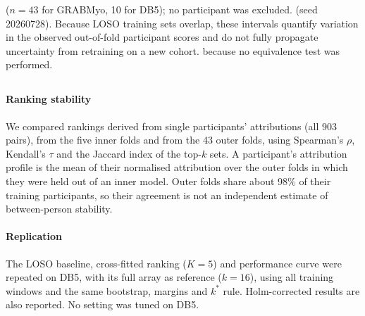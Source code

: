  ($n = 43$ for GRABMyo, 10 for DB5); no participant was excluded.  (seed 20260728). Because LOSO training sets overlap, these intervals quantify variation in the observed out-of-fold participant scores and do not fully propagate uncertainty from retraining on a new cohort.  because no equivalence test was performed.

\subsection[Exploratory and sensitivity analyses]{}
\label{sec:exploratory}


\paragraph{Ranking stability} We compared rankings derived from single participants' attributions (all 903 pairs), from the five inner folds and from the 43 outer folds, using Spearman's $\rho$, Kendall's $\tau$ and the Jaccard index of the top-$k$ sets. A participant's attribution profile is the mean of their normalised attribution over the outer folds in which they were held out of an inner model. Outer folds share about 98\% of their training participants, so their agreement is not an independent estimate of between-person stability.

\paragraph{Replication} The LOSO baseline, cross-fitted ranking ($K = 5$) and performance curve were repeated on DB5, with its full array as reference ($k = 16$), using all training windows and the same bootstrap, margins and $k^*$ rule. Holm-corrected results are also reported. No setting was tuned on DB5.

